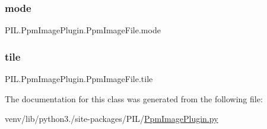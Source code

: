 \subsubsection{\texorpdfstring{mode}{mode}}
{\footnotesize\ttfamily P\+I\+L.\+Ppm\+Image\+Plugin.\+Ppm\+Image\+File.\+mode}

\mbox{\label{classPIL_1_1PpmImagePlugin_1_1PpmImageFile_aca198d609afa86c5146c42fc9ed1e6ac}} 
\subsubsection{\texorpdfstring{tile}{tile}}
{\footnotesize\ttfamily P\+I\+L.\+Ppm\+Image\+Plugin.\+Ppm\+Image\+File.\+tile}



The documentation for this class was generated from the following file\+:\begin{DoxyCompactItemize}
\item 
venv/lib/python3./site-\/packages/\+P\+I\+L/\hyperlink{PpmImagePlugin_8py}{Ppm\+Image\+Plugin.\+py}\end{DoxyCompactItemize}
